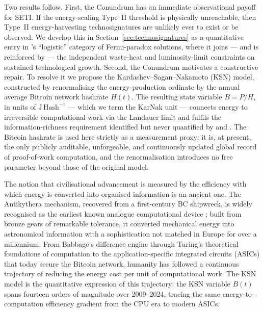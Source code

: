 Two results follow. First, the Conundrum has an immediate observational payoff for
SETI. If the energy-scaling Type~II threshold is physically unreachable, then Type~II
energy-harvesting technosignatures are unlikely ever to exist or be observed. We develop
this in Section~\ref{sec:technosignatures} as a quantitative entry in
\citeauthor{Cirkovic2018}'s \citeyearpar{Cirkovic2018} ``logistic'' category of
Fermi-paradox solutions, where it joins --- and is reinforced by --- the independent
waste-heat \citep{BalbiLingam2025} and luminosity-limit \citep{HaqqMisra2025b}
constraints on sustained technological growth. Second, the Conundrum motivates a
constructive repair. To resolve it we propose the Kardashev--Sagan--Nakamoto (KSN)
model, constructed by renormalising the energy-production ordinate by the annual average
Bitcoin network hashrate $H(t)$. The resulting state variable $B = P/H$, in units of
$\mathrm{J\,Hash^{-1}}$ --- which we term the KarNak unit --- connects energy to
irreversible computational work via the Landauer limit \citep{Landauer1961} and fulfils
the information-richness requirement identified but never quantified by
\citet{Kardashev1964} and \citet{Sagan1973}. The Bitcoin hashrate is used here strictly
as a measurement proxy: it is, at present, the only publicly auditable, unforgeable, and
continuously updated global record of proof-of-work computation, and the renormalisation
introduces no free parameter beyond those of the original model.

The notion that civilisational advancement is measured by the efficiency with which
energy is converted into organised information is an ancient one. The Antikythera
mechanism, recovered from a first-century BC shipwreck, is widely recognised as the
earliest known analogue computational device \citep{Freeth2021}; built from bronze gears
of remarkable tolerance, it converted mechanical energy into astronomical information
with a sophistication not matched in Europe for over a millennium. From Babbage's
difference engine through Turing's theoretical foundations of computation
\citep{Swade2017} to the application-specific integrated circuits (ASICs) that today
secure the Bitcoin network, humanity has followed a continuous trajectory of reducing
the energy cost per unit of computational work. The KSN model is the quantitative
expression of this trajectory: the KSN variable $B(t)$ spans fourteen orders of
magnitude over 2009--2024, tracing the same energy-to-computation efficiency gradient
from the CPU era to modern ASICs.

